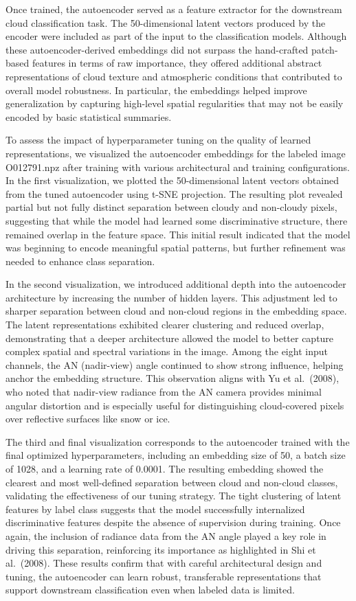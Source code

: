 \documentclass[11pt]{article}
\begin{document}
Once trained, the autoencoder served as a feature extractor for the
downstream cloud classification task. The 50-dimensional latent vectors
produced by the encoder were included as part of the input to the
classification models. Although these autoencoder-derived embeddings did
not surpass the hand-crafted patch-based features in terms of raw
importance, they offered additional abstract representations of cloud
texture and atmospheric conditions that contributed to overall model
robustness. In particular, the embeddings helped improve generalization
by capturing high-level spatial regularities that may not be easily
encoded by basic statistical summaries.

    To assess the impact of hyperparameter tuning on the quality of learned
representations, we visualized the autoencoder embeddings for the
labeled image O012791.npz after training with various architectural and
training configurations. In the first visualization, we plotted the
50-dimensional latent vectors obtained from the tuned autoencoder using
t-SNE projection. The resulting plot revealed partial but not fully
distinct separation between cloudy and non-cloudy pixels, suggesting
that while the model had learned some discriminative structure, there
remained overlap in the feature space. This initial result indicated
that the model was beginning to encode meaningful spatial patterns, but
further refinement was needed to enhance class separation.

In the second visualization, we introduced additional depth into the
autoencoder architecture by increasing the number of hidden layers. This
adjustment led to sharper separation between cloud and non-cloud regions
in the embedding space. The latent representations exhibited clearer
clustering and reduced overlap, demonstrating that a deeper architecture
allowed the model to better capture complex spatial and spectral
variations in the image. Among the eight input channels, the AN
(nadir-view) angle continued to show strong influence, helping anchor
the embedding structure. This observation aligns with Yu et al.~(2008),
who noted that nadir-view radiance from the AN camera provides minimal
angular distortion and is especially useful for distinguishing
cloud-covered pixels over reflective surfaces like snow or ice.

The third and final visualization corresponds to the autoencoder trained
with the final optimized hyperparameters, including an embedding size of
50, a batch size of 1028, and a learning rate of 0.0001. The resulting
embedding showed the clearest and most well-defined separation between
cloud and non-cloud classes, validating the effectiveness of our tuning
strategy. The tight clustering of latent features by label class
suggests that the model successfully internalized discriminative
features despite the absence of supervision during training. Once again,
the inclusion of radiance data from the AN angle played a key role in
driving this separation, reinforcing its importance as highlighted in
Shi et al.~(2008). These results confirm that with careful architectural
design and tuning, the autoencoder can learn robust, transferable
representations that support downstream classification even when labeled
data is limited.
\end{document}
